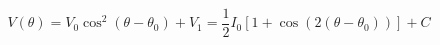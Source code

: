 \begin{equation}
\label{eq:Photodiode_Voltage}
V(\theta) = V_0 \cos^2(\theta - {\theta}_0)+ V_1 = \frac{1}{2}I_0\left[1 + \cos(2 (\theta - \theta_0))\right]+ C
\end{equation}